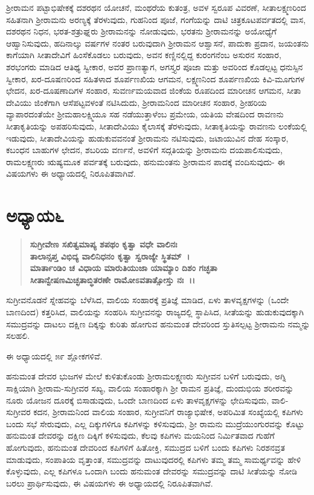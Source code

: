 ಶ‍್ರೀರಾಮನ ಪಟ್ಟಾಭಿಷೇಕಕ್ಕೆ ದಶರಥನ ಯೋಚನೆ, ಮಂಥರೆಯ ಕುತಂತ್ರ, ಅವಳ ಸ್ವರೂಪ ವಿವರಣೆ, ಸೀತಾಲಕ್ಷ್ಮಣರಿಂದ ಸಹಿತನಾಗಿ ಶ‍್ರೀರಾಮನು ಅರಣ್ಯಕ್ಕೆ ತೆರಳುವುದು, ಗುಹನಿಂದ ಪೂಜೆ, ಗಂಗೆಯನ್ನು ದಾಟಿ ಚಿತ್ರಕೂಟಪರ್ವತದಲ್ಲಿ ವಾಸ, ದಶರಥನ ನಿಧನ, ಭರತ-ಶತ್ರುಘ್ನರು ಶ‍್ರೀರಾಮನನ್ನು ನೋಡುವುದು, ಭರತನು ಶ‍್ರೀರಾಮನನ್ನು ಅಯೋಧ್ಯೆಗೆ ಆಹ್ವಾನಿಸುವುದು, ಹದಿನಾಲ್ಕು ವರ್ಷಗಳ ನಂತರ ಬರುವುದಾಗಿ ಶ‍್ರೀರಾಮನ ಆಶ್ವಾಸನೆ, ಪಾದುಕಾ ಪ್ರದಾನ, ಜಯಂತನು ಕಾಗೆಯಾಗಿ ಸೀತಾದೇವಿಗೆ ಹಿಂಸೆಕೊಡಲು ಬರುವುದು, ಅವನ ಕಣ್ಣಿನಲ್ಲಿದ್ದ ಕುರಂಗನೆಂಬ ಅಸುರನ ಸಂಹಾರ, ಶರಭಂಗರು ಮಾಡಿದ ಆತಿಥ್ಯ ಸ್ವೀಕಾರ, ಅವರ ಪ್ರಾಣತ್ಯಾಗ, ಅಗಸ್ತ್ಯರ ಪೂಜಾ ಮತ್ತು ಅವರಿಂದ ಕೊಡಲ್ಪಟ್ಟ ಧನುಸ್ಸಿನ ಸ್ವೀಕಾರ, ಖರ-ದೂಷಣರಿಂದ ಸಹಿತಳಾದ ಶೂರ್ಪಣಖಿಯ ಆಗಮನ, ಲಕ್ಷ್ಮಣನಿಂದ ಶೂರ್ಪಣಖಿಯ ಕಿವಿ-ಮೂಗುಗಳ ಛೇದನ, ಖರ-ದೂಷಣಾದಿಗಳ ಸಂಹಾರ, ಸುವರ್ಣಮಯವಾದ ಜಿಂಕೆಯ ರೂಪದಿಂದ ಮಾರೀಚನ ಆಗಮನ, ಸೀತಾ ದೇವಿಯು ಜಿಂಕೆಗಾಗಿ ಆಸೆಪಟ್ಟವಳಂತೆ ನಟಿಸಿದುದು, ಶ‍್ರೀರಾಮನಿಂದ ಮಾರೀಚನ ಸಂಹಾರ, ಶ‍್ರೀಹರಿಯ ವ್ಯಾಪಾರದಂತೆಯೇ ಶ‍್ರೀಮಹಾಲಕ್ಷ್ಮಿಯೂ ಸಹ ನಡೆಯುತ್ತಾಳೆಂಬ ಪ್ರಮೇಯ, ಯತಿಯ ವೇಷದಿಂದ ರಾವಣನು ಸೀತಾಕೃತಿಯನ್ನು ಅಪಹರಿಸುವುದು, ಸೀತಾದೇವಿಯು ಕೈಲಾಸಕ್ಕೆ ತೆರಳುವುದು, ಸೀತಾಕೃತಿಯನ್ನು ರಾವಣನು ಲಂಕೆಯಲ್ಲಿ ಇಡುವುದು, ಸೀತಾದೇವಿಯನ್ನು ಹುಡುಕುವವನಂತೆ ಶ‍್ರೀರಾಮನು ನಟಿಸುವುದು, ಜಟಾಯುವಿನ ದೇಹ ಸಂಸ್ಕಾರ, ಕಬಂಧನ ಬಾಹುಗಳ ಛೇದನ, ಶಬರಿಯ ವರ್ಣನೆ, ಅವಳಿಗೆ ಸದ್ಗತಿಯನ್ನು ಶ‍್ರೀರಾಮನು ದಯಪಾಲಿಸುವುದು, ರಾಮಲಕ್ಷ್ಮಣರು ಋಷ್ಯಮೂಕ ಪರ್ವತಕ್ಕೆ ಬರುವುದು, ಹನುಮಂತನು ಶ‍್ರೀರಾಮನ ಪಾದಕ್ಕೆ ವಂದಿಸುವುದು- ಈ ವಿಷಯಗಳು ಈ ಅಧ್ಯಾಯದಲ್ಲಿ ನಿರೂಪಿತವಾಗಿವೆ.


\section*{ಅಧ್ಯಾಯ\enginline{-}೬}

\begin{verse}
\textbf{ಸುಗ್ರೀವೇಣ ಸಖಿತ್ವಮಾಪ್ಯ ಶಪಥಂ ಕೃತ್ವಾ ವಧೇ ವಾಲಿನಃ}\\\textbf{ತಾಲಾನ್ಸಪ್ತ ವಿಭಿದ್ಯ ವಾಲಿನಿಧನಂ ಕೃತ್ವಾ ಸ್ವರಾಜ್ಯೇ ಸ್ಥಿತಮ್~।}\\\textbf{ಮಾರ್ತಾಂಡಿಂ ಚ ವಿಧಾಯ ಮಾರುತಿಯುಜಾ ಯಾಮ್ಯಾಂ ದಿಶಂ ಗಚ್ಛತಾ}\\\textbf{ಸೀತಾನ್ವೇಷಣಮಿಚ್ಛತಾಬ್ಧಿತರಣೇ ರಾಮೋಽವತಾತ್ಸೋಸ್ತು ನಃ~।।}
\end{verse}

ಸುಗ್ರೀವನೊಡನೆ ಸ್ನೇಹವನ್ನು ಬೆಳೆಸಿದ, ವಾಲಿಯ ಸಂಹಾರಕ್ಕೆ ಪ್ರತಿಜ್ಞೆ ಮಾಡಿದ, ಏಳು ತಾಳವೃಕ್ಷಗಳನ್ನು (ಒಂದೇ ಬಾಣದಿಂದ) ಕತ್ತರಿಸಿದ, ವಾಲಿಯನ್ನು ಸಂಹರಿಸಿ ಸುಗ್ರೀವನನ್ನು ರಾಜ್ಯದಲ್ಲಿ ಸ್ಥಾಪಿಸಿದ, ಸೀತೆಯನ್ನು ಹುಡುಕುವುದಕ್ಕಾಗಿ ಸಮುದ್ರವನ್ನು ದಾಟಲು ದಕ್ಷಿಣ ದಿಕ್ಕನ್ನು ಕುರಿತು ಹೋಗುವ ಹನುಮಂತ ದೇವರಿಂದ ಸ್ತುತಿಸಲ್ಪಟ್ಟ ಶ‍್ರೀರಾಮನು ನಮ್ಮನ್ನು ಸಲಹಲಿ.

ಈ ಅಧ್ಯಾಯದಲ್ಲಿ ೫೯ ಶ್ಲೋಕಗಳಿವೆ.

ಹನುಮಂತ ದೇವರ ಭುಜಗಳ ಮೇಲೆ ಕುಳಿತುಕೊಂಡು ಶ‍್ರೀರಾಮಲಕ್ಷ್ಮಣರು ಸುಗ್ರೀವನ ಬಳಿಗೆ ಬರುವುದು, ಅಗ್ನಿ ಸಾಕ್ಷಿಯಾಗಿ ಶ‍್ರೀರಾಮ-ಸುಗ್ರೀವರ ಸಖ್ಯ, ವಾಲಿಯ ಸಂಹಾರಕ್ಕಾಗಿ ಶ‍್ರೀ ರಾಮನ ಪ್ರತಿಜ್ಞೆ, ದುಂದುಭಿಯ ಶರೀರವನ್ನು ನೂರು ಯೋಜನ ದೂರಕ್ಕೆ ಬಿಸಾಡುವುದು, ಒಂದೇ ಬಾಣದಿಂದ ಏಳು ತಾಳವೃಕ್ಷಗಳನ್ನು ಛೇದಿಸುವುದು, ವಾಲಿ-ಸುಗ್ರೀವರ ಕದನ, ಶ‍್ರೀರಾಮನಿಂದ ವಾಲಿಯ ಸಂಹಾರ, ಸುಗ್ರೀವನಿಗೆ ರಾಜ್ಯಾಭಿಷೇಕ, ಅಪರಿಮಿತ ಸಂಖ್ಯೆಯಲ್ಲಿ ಕಪಿಗಳು ಬಂದು ಸಭೆ ಸೇರುವುದು, ಎಲ್ಲ ದಿಕ್ಕುಗಳಿಗೂ ಕಪಿಗಳನ್ನು ಕಳಿಸುವುದು, ಶ‍್ರೀ ರಾಮನು ಮುದ್ರೆಯುಂಗುರವನ್ನು ಕೊಟ್ಟು ಹನುಮಂತ ದೇವರನ್ನು ದಕ್ಷಿಣ ದಿಕ್ಕಿಗೆ ಕಳಿಸುವುದು, ಕೆಲವು ಕಪಿಗಳು ಮಯನಿಂದ ನಿರ್ಮಿತವಾದ ಗುಹೆಗೆ ಹೋಗುವುದು, ಹನುಮಂತ ದೇವರಿಂದ ಕಪಿಗಳಿಗೆ ಹಿತೋಕ್ತಿ, ಸಮುದ್ರದ ಬಳಿಗೆ ಬಂದು ಕಪಿಗಳು ನಿರಶನವ್ರತ ಮಾಡುವುದು, ಸಂಪಾತಿಯ ವೃತ್ತಾಂತ, ಸಮುದ್ರವನ್ನು ದಾಟುವುದರಲ್ಲಿ ಕಪಿಗಳು ತಮ್ಮ ತಮ್ಮ ಸಾಮರ್ಥ್ಯವನ್ನು ಹೇಳಿ ಕೊಳ್ಳುವುದು, ಎಲ್ಲ ಕಪಿಗಳೂ ಒಂದಾಗಿ ಬಂದು ಹನುಮಂತ ದೇವರನ್ನು ಸಮುದ್ರವನ್ನು ದಾಟಿ ಸೀತೆಯನ್ನು ನೋಡಿ ಬರಲು ಪ್ರಾರ್ಥಿಸುವುದು, ಈ ವಿಷಯಗಳು ಈ ಅಧ್ಯಾಯದಲ್ಲಿ ನಿರೂಪಿತವಾಗಿವೆ.



